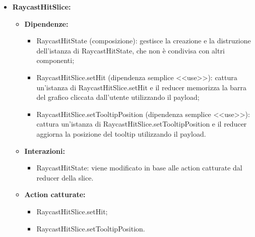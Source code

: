\begin{itemize}
      \item \textbf{RaycastHitSlice:}
            \begin{itemize}
                  \item \textbf{Dipendenze:}
                        \begin{itemize}
                              \item RaycastHitState (composizione): gestisce la creazione e la distruzione
                                    dell'istanza di RaycastHitState, che non è condivisa con altri componenti;
                              \item RaycastHitSlice.setHit (dipendenza semplice <<use>>): cattura un'istanza di
                                    RaycastHitSlice.setHit e il reducer memorizza la barra del grafico cliccata
                                    dall'utente utilizzando il payload;
                              \item RaycastHitSlice.setTooltipPosition (dipendenza semplice <<use>>): cattura
                                    un'istanza di RaycastHitSlice.setTooltipPosition e il reducer aggiorna la
                                    posizione del tooltip utilizzando il payload.
                        \end{itemize}
                  \item \textbf{Interazioni:}
                        \begin{itemize}
                              \item RaycastHitState: viene modificato in base alle action catturate dal reducer
                                    della slice.
                        \end{itemize}
                  \item \textbf{Action catturate:}
                        \begin{itemize}
                              \item RaycastHitSlice.setHit;
                              \item RaycastHitSlice.setTooltipPosition.
                        \end{itemize}
            \end{itemize}


\end{itemize}

